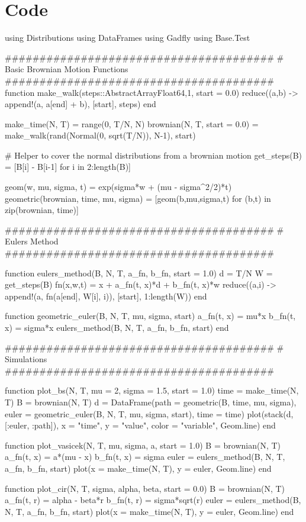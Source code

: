 \documentclass[a4paper,12pt]{article}
\begin{document}
\section*{Code}
\begin{juliacode}
using Distributions
using DataFrames
using Gadfly
using Base.Test

#######################################
# Basic Brownian Motion Functions
#######################################
function make_walk(steps::AbstractArray{Float64,1}, start = 0.0)
    reduce((a,b) -> append!(a, a[end] + b), [start], steps)
end

make_time(N, T) = range(0, T/N, N)
brownian(N, T, start = 0.0) = make_walk(rand(Normal(0, sqrt(T/N)), N-1), start)

# Helper to cover the normal distributions from a brownian motion
get_steps(B) = [B[i] - B[i-1] for i in 2:length(B)]

geom(w, mu, sigma, t) = exp(sigma*w + (mu - sigma^2/2)*t)
geometric(brownian, time, mu, sigma) = [geom(b,mu,sigma,t) for (b,t) in zip(brownian, time)]

#######################################
# Eulers Method
#######################################

function eulers_method(B, N, T, a_fn, b_fn, start = 1.0)
    d = T/N
    W = get_steps(B)
    fn(x,w,t) = x + a_fn(t, x)*d + b_fn(t, x)*w
    reduce((a,i) -> append!(a, fn(a[end], W[i], i)), [start], 1:length(W))
end

function geometric_euler(B, N, T, mu, sigma, start)
    a_fn(t, x) = mu*x
    b_fn(t, x) = sigma*x
    eulers_method(B, N, T, a_fn, b_fn, start)
end

#######################################
# Simulations
#######################################

function plot_bs(N, T, mu = 2, sigma = 1.5, start = 1.0)
    time = make_time(N, T)
    B = brownian(N, T)
    d = DataFrame(path = geometric(B, time, mu, sigma),
                  euler = geometric_euler(B, N, T, mu, sigma, start),
                  time = time)
    plot(stack(d, [:euler, :path]), x = "time", y = "value", color = "variable", Geom.line)
end

function plot_vasicek(N, T, mu, sigma, a, start = 1.0)
    B = brownian(N, T)
    a_fn(t, x) = a*(mu - x)
    b_fn(t, x) = sigma
    euler = eulers_method(B, N, T, a_fn, b_fn, start)
    plot(x = make_time(N, T), y = euler, Geom.line)
end

function plot_cir(N, T, sigma, alpha, beta, start = 0.0)
    B = brownian(N, T)
    a_fn(t, r) = alpha - beta*r
    b_fn(t, r) = sigma*sqrt(r)
    euler = eulers_method(B, N, T, a_fn, b_fn, start)
    plot(x = make_time(N, T), y = euler, Geom.line)
end
\end{juliacode}
\end{document}
